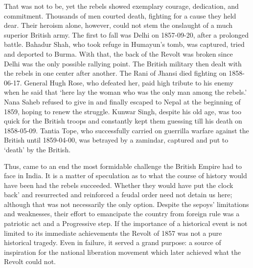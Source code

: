 That was not to be, yet the rebels showed exemplary courage, dedication, and commitment. Thousands of men courted death, fighting for a cause they held dear. Their heroism alone, however, could not stem the onslaught of a much superior British army. The first to fall was Delhi on 1857-09-20, after a prolonged battle. Bahadur Shah, who took refuge in Humayun's tomb, was captured, tried and deported to Burma. With that, the back of the Revolt was broken since Delhi was the only possible rallying point. The British military then dealt with the rebels in one center after another. The Rani of Jhansi died fighting on 1858-06-17. General Hugh Rose, who defeated her, paid high tribute to his enemy when he said that `here lay the woman who was the only man among the rebels.' Nana Saheb refused to give in and finally escaped to Nepal at the beginning of 1859, hoping to renew the struggle. Kunwar Singh, despite his old age, was too quick for the British troops and constantly kept them guessing till his death on 1858-05-09. Tantia Tope, who successfully carried on guerrilla warfare against the British until 1859-04-00, was betrayed by a zamindar, captured and put to `death' by the British.

Thus, came to an end the most formidable challenge the British Empire had to face in India. It is a matter of speculation as to what the course of history would have been had the rebels succeeded. Whether they would have put the clock back' and resurrected and reinforced a feudal order need not detain us here; although that was not necessarily the only option. Despite the sepoys' limitations and weaknesses, their effort to emancipate the country from foreign rule was a patriotic act and a Progressive step. If the importance of a historical event is not limited to its immediate achievements the Revolt of 1857 was not a pure historical tragedy. Even in failure, it served a grand purpose: a source of inspiration for the national liberation movement which later achieved what the Revolt could not.
